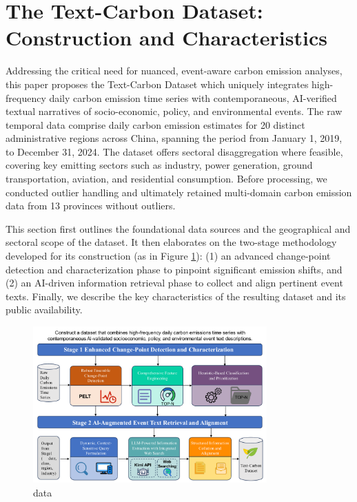 \section{The Text-Carbon Dataset: Construction and Characteristics} %
\label{sec:Data}

Addressing the critical need for nuanced, event-aware carbon emission analyses, this paper proposes the Text-Carbon Dataset which uniquely integrates high-frequency daily carbon emission time series with contemporaneous, AI-verified textual narratives of socio-economic, policy, and environmental events. The raw temporal data comprise daily carbon emission estimates for 20 distinct administrative regions across China, spanning the period from January 1, 2019, to December 31, 2024. The dataset offers sectoral disaggregation where feasible, covering key emitting sectors such as industry, power generation, ground transportation, aviation, and residential consumption. Before processing, we conducted outlier handling and ultimately retained multi-domain carbon emission data from 13 provinces without outliers.


This section first outlines the foundational data sources and the geographical and sectoral scope of the dataset. It then elaborates on the two-stage methodology developed for its construction (as in Figure \ref{fig:dataprocess}): (1) an advanced change-point detection and characterization phase to pinpoint significant emission shifts, and (2) an AI-driven information retrieval phase to collect and align pertinent event texts. Finally, we describe the key characteristics of the resulting dataset and its public availability.

\begin{figure}[ht]
    \centering
    \includegraphics[width=0.8\textwidth]{Figure/data_process.pdf}
    \caption{data}
    \label{fig:dataprocess}
\end{figure}



